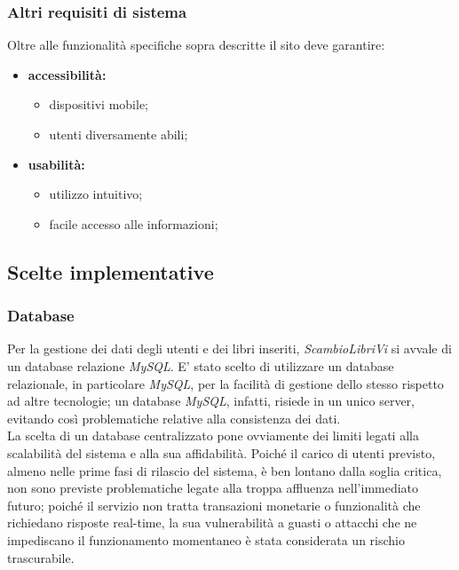 \documentclass[openany,10pt,a4paper]{article}
\begin{document}
		\subsubsection{Altri requisiti di sistema}	
		Oltre alle funzionalità specifiche sopra descritte il sito deve garantire:
			\begin{itemize}
				\item \textbf{accessibilità:}
					\begin{itemize}
						\item dispositivi mobile;
						\item utenti diversamente abili;
					\end{itemize}
				\item \textbf{usabilità:}
					\begin{itemize}
						\item utilizzo intuitivo;
						\item facile accesso alle informazioni;
					\end{itemize}
			\end{itemize}
			
	\subsection{Scelte implementative}
		\subsubsection{Database}
			Per la gestione dei dati degli utenti e dei libri inseriti, \textit{ScambioLibriVi} si avvale di un 
			database relazione \textit{MySQL}.
			E' stato scelto di utilizzare un database relazionale, in particolare \textit{MySQL}, per la facilità di gestione dello stesso rispetto ad altre tecnologie; un database \textit{MySQL}, infatti, risiede in un unico server, evitando così problematiche relative alla consistenza dei dati. \\ La scelta di un database centralizzato pone ovviamente dei limiti legati alla scalabilità del sistema e alla sua affidabilità. Poiché il carico di utenti previsto, almeno nelle prime fasi di rilascio del sistema, è ben lontano dalla soglia critica, non sono previste problematiche legate alla troppa affluenza nell'immediato futuro; poiché il servizio non tratta transazioni monetarie o funzionalità che richiedano risposte real-time, la sua vulnerabilità a guasti o attacchi che ne impediscano il funzionamento momentaneo è stata considerata un rischio trascurabile.
\end{document}
